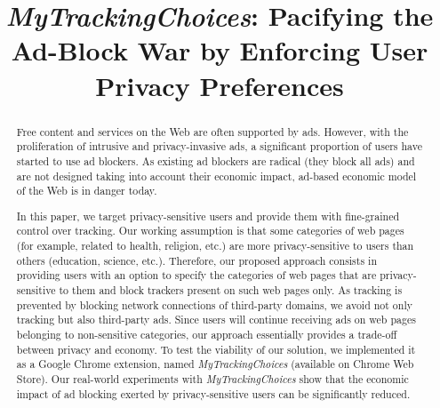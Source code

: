 \documentclass[conference]{IEEEtran}
\begin{document}
 

\title{\emph{MyTrackingChoices}: Pacifying the Ad-Block War by Enforcing User Privacy Preferences}






\author{
\and
{}
\and
{}
}























\maketitle
\begin{abstract}
Free content and services on the Web are often supported by ads.
However, with the proliferation of intrusive and privacy-invasive ads, a significant proportion of users have started to use ad blockers.
As existing ad blockers are radical (they block all ads) and are not designed taking into account their economic impact, ad-based economic model of the Web is in danger today.

In this paper, we target privacy-sensitive users and provide them with fine-grained control over tracking.
Our working assumption is that some categories of web pages (for example, related to health, religion, etc.) are more privacy-sensitive to users than others (education, science, etc.).
Therefore, our proposed approach consists in providing users with an option to specify the categories of web pages that are privacy-sensitive to them and block trackers present on such web pages only.
As tracking is prevented by blocking network connections of third-party domains, we avoid not only tracking but also third-party ads.
Since users will continue receiving ads on web pages belonging to non-sensitive categories, our approach essentially provides a trade-off between privacy and economy.
To test the viability of our solution, we implemented it as a Google Chrome extension, named \emph{MyTrackingChoices} (available on Chrome Web Store).
Our real-world experiments with \emph{MyTrackingChoices} show that the economic impact of ad blocking exerted by privacy-sensitive users can be significantly reduced.


\end{abstract}
\end{document}
